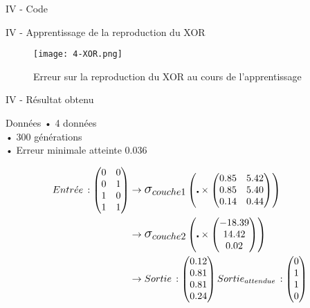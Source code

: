 \begin{frame}{IV - Code}
	
\end{frame}


\begin{frame}{IV - Apprentissage de la reproduction du XOR}
	\begin{figure}
		\centering
		\texttt{[image: 4-XOR.png]}
		\caption{Erreur sur la reproduction du XOR au cours de l'apprentissage}
	\end{figure}
\end{frame}


\begin{frame}{IV - Résultat obtenu}
	\begin{block}{Données}
		• 4 données \\
		• 300 générations \\
		• Erreur minimale atteinte 0.036
	\end{block}
	\begin{align*}
		Entr\acute{e} e\, :
		\begin{pmatrix}
			0 & 0 \\
			0 & 1 \\
			1 & 0 \\
			1 & 1
		\end{pmatrix}
		 & \to
		\mathlarger{\mathlarger{\sigma_{couche1}}}
		\left( \centerdot \times
		\begin{pmatrix}
				0.85 & 5.42 \\
				0.85 & 5.40 \\
				0.14 & 0.44
			\end{pmatrix}
		\right) \\
		 & \to
		\mathlarger{\mathlarger{\sigma_{couche2}}}
		\left( \centerdot \times
		\begin{pmatrix}
				-18.39 \\
				14.42  \\
				0.02
			\end{pmatrix}
		\right) \\
		 & \to
		Sortie\, :
		\begin{pmatrix}
			0.12 \\
			0.81 \\
			0.81 \\
			0.24
		\end{pmatrix}
		Sortie_{attendue}\, :
		\begin{pmatrix}
			0 \\
			1 \\
			1 \\
			0
		\end{pmatrix}
	\end{align*}
\end{frame}